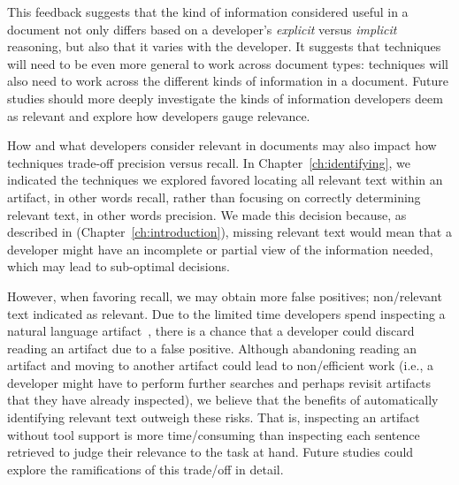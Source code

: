 \smallskip
This feedback suggests that the kind of information considered useful in a document not only differs based on 
a developer's  \textit{explicit} versus \textit{implicit} reasoning, but also that it varies with the developer. 
It suggests that techniques will need to
be even more general to work across document
types: techniques will also need to work across
the different kinds of information in a document.
Future studies should more deeply investigate
the kinds of information developers deem as
relevant and explore how developers gauge relevance.





How and what developers consider relevant in
documents may also impact how techniques trade-off
precision versus recall. 
In Chapter~\ref{ch:identifying}, we indicated
the techniques we explored favored locating
all relevant text within an
artifact, in other words recall, rather
than focusing on 
correctly determining relevant text, in other
words precision. 
We made this decision because, as described in 
 (Chapter~\ref{ch:introduction}),
missing relevant text would mean that a developer might have an incomplete or partial view of the information needed, which may lead to
sub-optimal decisions.






However, when favoring recall,  we may obtain more false positives; non\-/relevant text indicated as relevant.
Due to the limited time developers spend inspecting a natural language artifact~\cite{Starke2009}, there is a chance that
 a developer could discard reading an artifact due to a false positive. 
 Although abandoning reading an artifact and moving to another artifact could lead to non\-/efficient work
 (i.e., a developer might have to perform further searches and perhaps revisit artifacts that they have already inspected),
we believe that the benefits of automatically identifying relevant text outweigh these risks. 
That is, inspecting an artifact without tool support is more time\-/consuming
than inspecting each sentence retrieved to judge their relevance to the task at hand. 
Future studies could explore the ramifications
of this trade\-/off in detail.









